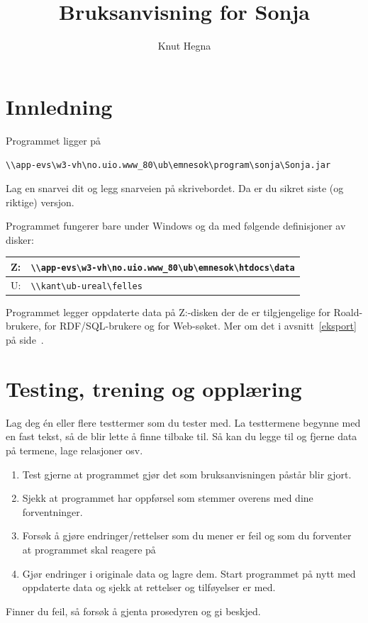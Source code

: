 \documentclass[a4paper,norsk,11pt]{article}
\title{Bruksanvisning for Sonja}
\author{Knut Hegna}
\begin{document}
\maketitle
\tableofcontents
\section{Innledning}
Programmet ligger på 

\verb=\\app-evs\w3-vh\no.uio.www_80\ub\emnesok\program\sonja\Sonja.jar= 

\noindent{}Lag en snarvei dit og legg snarveien på skrivebordet. Da er du sikret siste (og riktige) versjon. 

Programmet fungerer bare under Windows og da med følgende definisjoner av disker:

\begin{center}
 \begin{tabular}{|l|l|}\hline
  Z:&\verb=\\app-evs\w3-vh\no.uio.www_80\ub\emnesok\htdocs\data=\\\hline
  U:&\verb=\\kant\ub-ureal\felles=\\\hline
 \end{tabular}
\end{center}

\noindent{}Programmet legger oppdaterte data  på Z:-disken der de er tilgjengelige for Roald-brukere, for RDF/SQL-brukere og for Web-søket. Mer om det i avsnitt~\ref{eksport} på side~\pageref{eksport}.
\section{Testing, trening og opplæring}
Lag deg én eller flere testtermer som du tester med. La testtermene begynne med en fast tekst, så de blir lette å finne tilbake til. Så kan du legge til og fjerne data på termene, lage relasjoner osv.
\begin{enumerate}
\item Test gjerne at programmet gjør det som bruksanvisningen påstår blir gjort.
\item Sjekk at programmet har oppførsel som stemmer overens med dine forventninger.
\item Forsøk å gjøre endringer/rettelser som du mener er feil og som du forventer at programmet skal reagere på
\item Gjør endringer i originale data og lagre dem. Start programmet på nytt med oppdaterte data og sjekk at rettelser og tilføyelser er med.
\end{enumerate}
Finner du feil, så forsøk å gjenta prosedyren og gi beskjed.
\end{document}
